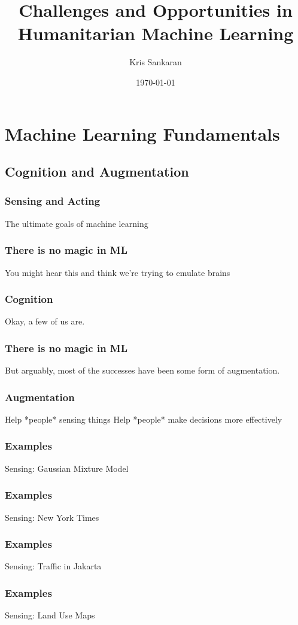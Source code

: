 \documentclass[10pt,mathserif]{beamer}
\title{\large \bfseries Challenges and Opportunities in \\
  Humanitarian Machine Learning}
\author{Kris Sankaran}
\date{\today}
\begin{document}
\maketitle

\section{Machine Learning Fundamentals}
\label{sec:label}

\subsection{Cognition and Augmentation}
\label{subsec:label}

\begin{frame}[]
  \frametitle{Sensing and Acting}
  The ultimate goals of machine learning
\end{frame}

\begin{frame}
  \frametitle{There is no magic in ML}
  You might hear this and think we're trying to emulate brains
\end{frame}

\begin{frame}
  \frametitle{Cognition}
  Okay, a few of us are.
\end{frame}

\begin{frame}
  \frametitle{There is no magic in ML}
  But arguably, most of the successes have been some form of augmentation.
\end{frame}

\begin{frame}
  \frametitle{Augmentation}
  Help *people* sensing things
  Help *people* make decisions more effectively
\end{frame}

\begin{frame}
  \frametitle{Examples}
 Sensing: Gaussian Mixture Model 
\end{frame}

\begin{frame}
  \frametitle{Examples}
  Sensing: New York Times
\end{frame}

\begin{frame}
  \frametitle{Examples}
  Sensing: Traffic in Jakarta
\end{frame}

\begin{frame}
  \frametitle{Examples}
  Sensing: Land Use Maps
\end{frame}
\end{document}
